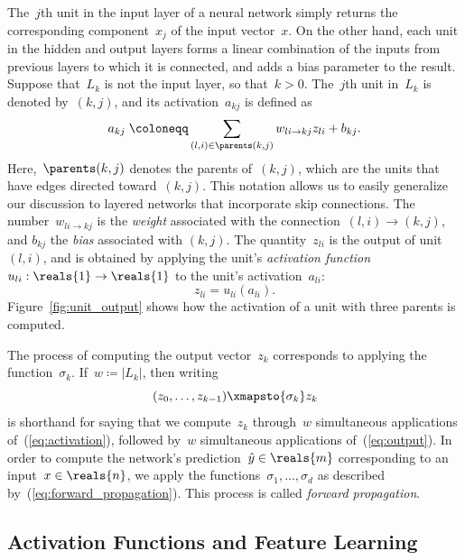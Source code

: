 \documentclass[11pt,a4paper]{article}
\numberwithin{equation}{section}
\newcommand{\weight}[2]{w_{#1 \rightarrow #2}}
\begin{document}
The~$j$th unit in the input layer of a neural network simply returns the
corresponding component~$x_j$ of the input vector~$x$. On the other hand, each
unit in the hidden and output layers forms a linear combination of the inputs
from previous layers to which it is connected, and adds a bias parameter to the
result. Suppose that~$L_k$ is not the input layer, so that~$k > 0$. The~$j$th
unit in~$L_k$ is denoted by~$(k, j)$, and its activation~$a_{kj}$ is defined as
\begin{equation}
	a_{kj} \;\coloneqq \sum_{(l, i) \in \parents(k, j)} \weight{li}{kj} z_{li} + b_{kj}.
	\label{eq:activation}
\end{equation}
Here,~$\parents(k, j)$ denotes the parents of~$(k, j)$, which are the units that
have edges directed toward~$(k, j)$. This notation allows us to easily
generalize our discussion to layered networks that incorporate skip connections.
The number~$\weight{li}{kj}$ is the \emph{weight} associated with the
connection~$(l, i) \rightarrow (k, j)$, and $b_{kj}$ the \emph{bias} associated
with $(k, j)$. The quantity~$z_{li}$ is the output of unit~$(l, i)$, and is
obtained by applying the unit's \emph{activation function} $u_{li} : \reals{1}
\to \reals{1}$ to the unit's activation~$a_{li}$:
\begin{equation}
	z_{li} = u_{li}(a_{li}).
	\label{eq:output}
\end{equation}
Figure~\ref{fig:unit_output} shows how the activation of a unit with three
parents is computed.

The process of computing the output vector~$z_k$ corresponds to applying the
function~$\sigma_k$. If~$w \coloneqq |L_k|$, then writing
\[
	(z_0, \ldots, z_{k - 1}) \xmapsto{\sigma_k} z_k
\]
is shorthand for saying that we compute~$z_k$ through~$w$ simultaneous
applications of~(\ref{eq:activation}), followed by~$w$ simultaneous
applications of~(\ref{eq:output}). In order to compute the network's
prediction~$\hat{y} \in \reals{m}$ corresponding to an input~$x \in \reals{n}$,
we apply the functions~$\sigma_1, \ldots, \sigma_d$ as described
by~(\ref{eq:forward_propagation}). This process is called \emph{forward
propagation}.

\subsection{Activation Functions and Feature Learning}
\label{sec:act_func_and_fl}
\end{document}
